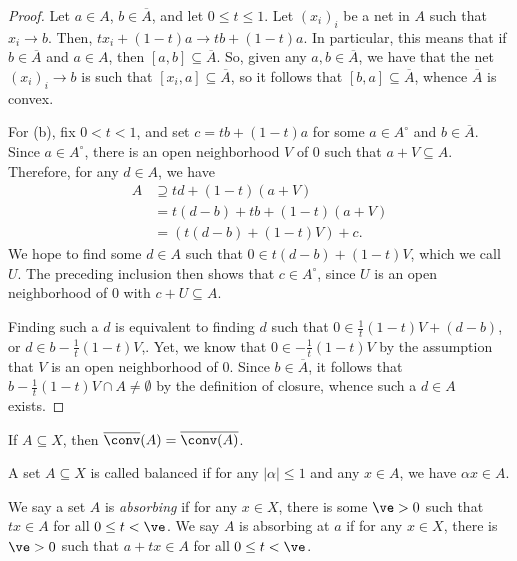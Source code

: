 \documentclass[10pt]{mypackage}
\begin{document}
\begin{proof}
  Let $a\in A$, $b\in \overline{A}$, and let $0\leq t \leq 1$. Let $\left( x_i \right)_i$ be a net in $A$ such that $x_i\rightarrow b$. Then, $tx_i + \left( 1-t \right)a \rightarrow tb + \left( 1-t \right)a$. In particular, this means that if $b\in \overline{A}$ and $a\in A$, then $\left[ a,b \right]\subseteq \overline{A}$. So, given any $a,b\in \overline{A}$, we have that the net $\left( x_i \right)_i\rightarrow b$ is such that $\left[x_i,a\right]\subseteq \overline{A}$, so it follows that $\left[ b,a \right]\subseteq \overline{A}$, whence $ \overline{A} $ is convex.

  For (b), fix $0 < t < 1$, and set $c = tb + \left( 1-t \right)a$ for some $a\in A^{\circ}$ and $b\in \overline{A}$. Since $a\in A^{\circ}$, there is an open neighborhood $V$ of $0$ such that $a + V\subseteq A$. Therefore, for any $d\in A$, we have
  \begin{align*}
    A &\supseteq td + \left( 1-t \right)\left( a + V \right)\\
      &= t\left( d-b \right) + tb + \left( 1-t \right)\left( a + V \right)\\
      &= \left( t\left( d-b \right) + \left( 1-t \right)V \right) + c.
  \end{align*}
  We hope to find some $d\in A$ such that $0\in t\left( d-b \right) + \left( 1-t \right)V$, which we call $U$. The preceding inclusion then shows that $c\in A^{\circ}$, since $U$ is an open neighborhood of $0$ with $c + U\subseteq A$.

  Finding such a $d$ is equivalent to finding $d$ such that $0\in \frac{1}{t}\left( 1-t \right)V + \left( d-b \right)$, or $d\in b-\frac{1}{t}\left( 1-t \right)V$,. Yet, we know that $0\in - \frac{1}{t}\left( 1-t \right)V$ by the assumption that $V$ is an open neighborhood of $0$. Since $b\in \overline{A}$, it follows that $b-\frac{1}{t}\left( 1-t \right)V \cap A \neq \emptyset$ by the definition of closure, whence such a $d\in A$ exists.
\end{proof}
\begin{corollary}
  If $A\subseteq X$, then $ \overline{\conv}(A) = \overline{\conv(A)} $.
\end{corollary}
\begin{definition}
  A set $A\subseteq X$ is called balanced if for any $ \left\vert \alpha \right\vert\leq 1 $ and any $x\in A$, we have $\alpha x\in A$.

  We say a set $A$ is \textit{absorbing} if for any $x\in X$, there is some $\ve > 0$ such that $tx\in A$ for all $0\leq t < \ve$. We say $A$ is absorbing at $a$ if for any $x\in X$, there is $\ve > 0$ such that $a + tx\in A$ for all $0\leq t < \ve$.
\end{definition}
\end{document}
